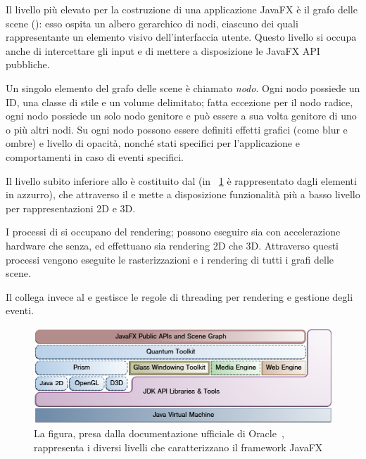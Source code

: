             Il livello più elevato per la costruzione di una applicazione JavaFX è il grafo delle scene (): esso ospita un albero gerarchico di nodi, ciascuno dei quali rappresentante un elemento visivo dell'interfaccia utente. Questo livello si occupa anche di intercettare gli input e di mettere a disposizione le JavaFX API pubbliche.

            Un singolo elemento del grafo delle scene è chiamato \emph{nodo}. Ogni nodo possiede un ID, una classe di stile e un volume delimitato; fatta eccezione per il nodo radice, ogni nodo possiede un solo nodo genitore e può essere a sua volta genitore di uno o più altri nodi. Su ogni nodo possono essere definiti effetti grafici (come blur e ombre) e livello di opacità, nonché stati specifici per l'applicazione e comportamenti in caso di eventi specifici.

            Il livello subito inferiore allo  è costituito dal  (in \figurename~\ref{fig:jfxArch} è rappresentato dagli elementi in azzurro), che attraverso il  e  mette a disposizione funzionalità più a basso livello per rappresentazioni 2D e 3D.

            I processi di  si occupano del rendering; possono eseguire sia con accelerazione hardware che senza, ed effettuano sia rendering 2D che 3D.
            Attraverso questi processi vengono eseguite le rasterizzazioni e i rendering di tutti i grafi delle scene.

            Il  collega invece  al  e gestisce le regole di threading per rendering e gestione degli eventi.

            \begin{figure}[htbp]
                \centering
                \includegraphics[scale=0.75]{img/jfxArch}
                \caption{La figura, presa dalla documentazione ufficiale di Oracle~\cite{java8}, rappresenta i diversi livelli che caratterizzano il framework JavaFX}
                \label{fig:jfxArch}
            \end{figure}

